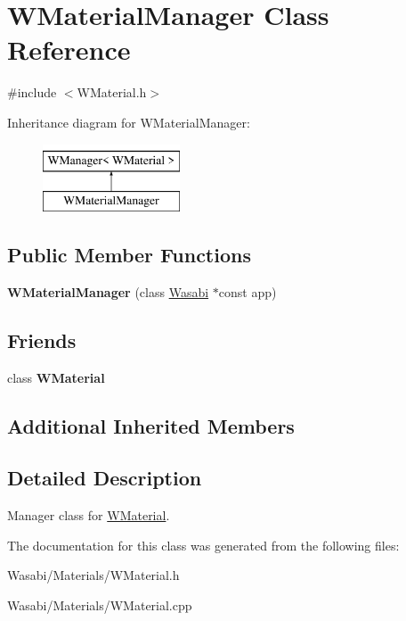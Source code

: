 \hypertarget{class_w_material_manager}{}\section{W\+Material\+Manager Class Reference}
\label{class_w_material_manager}


{\ttfamily \#include $<$W\+Material.\+h$>$}

Inheritance diagram for W\+Material\+Manager\+:\begin{figure}[H]
\begin{center}
\leavevmode
\includegraphics[height=2.000000cm]{class_w_material_manager}
\end{center}
\end{figure}
\subsection*{Public Member Functions}
\begin{DoxyCompactItemize}
\item 
{\bfseries W\+Material\+Manager} (class \hyperlink{class_wasabi}{Wasabi} $\ast$const app)\hypertarget{class_w_material_manager_a0fd1d6202eadb0619c2790374f78d22c}{}\label{class_w_material_manager_a0fd1d6202eadb0619c2790374f78d22c}

\end{DoxyCompactItemize}
\subsection*{Friends}
\begin{DoxyCompactItemize}
\item 
class {\bfseries W\+Material}\hypertarget{class_w_material_manager_a82829be2ace0f839dd132dface8a4da3}{}\label{class_w_material_manager_a82829be2ace0f839dd132dface8a4da3}

\end{DoxyCompactItemize}
\subsection*{Additional Inherited Members}


\subsection{Detailed Description}
Manager class for \hyperlink{class_w_material}{W\+Material}. 

The documentation for this class was generated from the following files\+:\begin{DoxyCompactItemize}
\item 
Wasabi/\+Materials/W\+Material.\+h\item 
Wasabi/\+Materials/W\+Material.\+cpp\end{DoxyCompactItemize}
